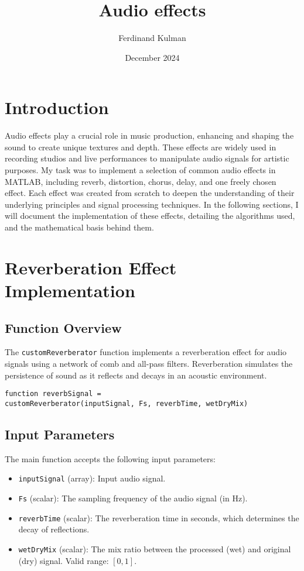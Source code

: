 \documentclass{article}
\title{Audio effects}
\author{Ferdinand Kulman}
\date{December 2024}
\begin{document}
\maketitle

\section{Introduction}

Audio effects play a crucial role in music production, enhancing and shaping the sound to create unique textures and depth. These effects are widely used in recording studios and live performances to manipulate audio signals for artistic purposes. My task was to implement a selection of common audio effects in MATLAB, including reverb, distortion, chorus, delay, and one freely chosen effect. Each effect was created from scratch to deepen the understanding of their underlying principles and signal processing techniques. In the following sections, I will document the implementation of these effects, detailing the algorithms used, and the mathematical basis behind them.

\section{Reverberation Effect Implementation}

\subsection{Function Overview}
The \texttt{customReverberator} function implements a reverberation effect for audio signals using a network of comb and all-pass filters. Reverberation simulates the persistence of sound as it reflects and decays in an acoustic environment.

\begin{verbatim}
function reverbSignal =
customReverberator(inputSignal, Fs, reverbTime, wetDryMix)
\end{verbatim}

\subsection{Input Parameters}
The main function accepts the following input parameters:
\begin{itemize}
    \item \texttt{inputSignal} (array): Input audio signal.
    \item \texttt{Fs} (scalar): The sampling frequency of the audio signal (in Hz).
    \item \texttt{reverbTime} (scalar): The reverberation time in seconds, which determines the decay of reflections.
    \item \texttt{wetDryMix} (scalar): The mix ratio between the processed (wet) and original (dry) signal. Valid range: $[0, 1]$.
\end{itemize}
\end{document}
